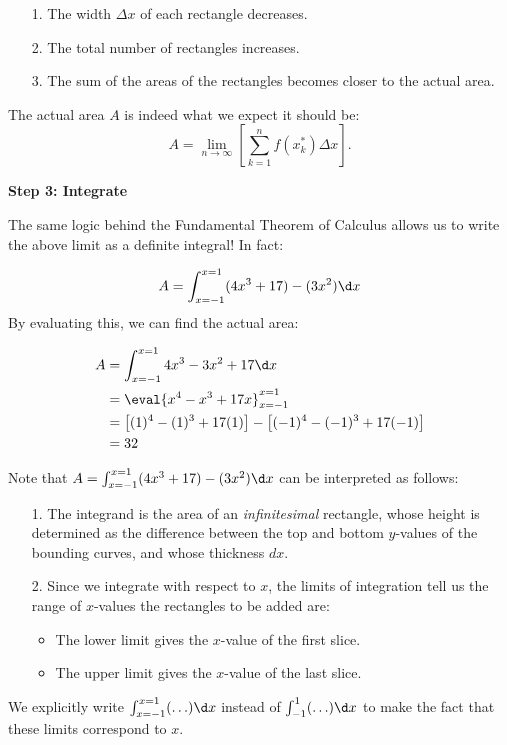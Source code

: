 \documentclass{ximera}
\begin{document}
\begin{itemize}
\item[1.] The width $\Delta x$ of each rectangle decreases.
\item[2.] The total number of rectangles increases.
\item[3.] The sum of the areas of the rectangles becomes closer to the actual area.
\end{itemize}

The actual area $A$ is indeed what we expect it should be: $$A = \lim_{n \rightarrow \infty} \left[ \sum_{k=1}^n f(x_k^*) \Delta x \right].$$ 

\vspace{3mm}
\textbf{Step 3: Integrate}

The same logic behind the Fundamental Theorem of Calculus allows us to write the above limit as a definite integral!  In fact:

\[
A = \int_{x=-1}^{x=1} (4x^3+17)-(3x^2) \d x
\]
By evaluating this, we can find the actual area:

\begin{align*}
A &= \int_{x=-1}^{x=1} 4x^3-3x^2+17 \d x \\
&= \eval{ x^4-x^3+17x}_{x= -1}^{x=1} \\
&= \left[(1)^4-(1)^3+17(1)\right] -  \left[(-1)^4-(-1)^3+17(-1)\right] \\
&=32
\end{align*}


Note that $A = \int_{x=-1}^{x=1} (4x^3+17)-(3x^2) \d x$ can be interpreted as follows:
\begin{itemize}
\item[1.] The integrand is the area of an \emph{infinitesimal} rectangle, whose height is determined as the difference between the top and bottom $y$-values of the bounding curves, and whose thickness $dx$. 
\item[2.] Since we integrate with respect to $x$, the limits of integration tell us the range of $x$-values the rectangles to be added are:
\begin{itemize}
\item The lower limit gives the $x$-value of the first slice.
\item The upper limit gives the $x$-value of the last slice.
\end{itemize}
\end{itemize}
We explicitly write $\int_{x=-1}^{x=1} (\ldots) \d x $ instead of $\int_{-1}^1(\ldots) \d x $ to make the fact that these limits correspond to $x$. 
\end{document}
